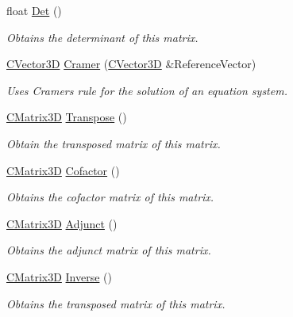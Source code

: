 \begin{DoxyCompactItemize}
\item 
float \hyperlink{struct_c_matrix3_d_ada0f0cc1d05bab82dcdda89af4d62616}{Det} ()
\begin{DoxyCompactList}\small\item\em Obtains the determinant of this matrix. \end{DoxyCompactList}\item 
\hyperlink{struct_c_vector3_d}{C\+Vector3D} \hyperlink{struct_c_matrix3_d_a9911c4211c2c0bf5b5b471f903d8bdec}{Cramer} (\hyperlink{struct_c_vector3_d}{C\+Vector3D} \&Reference\+Vector)
\begin{DoxyCompactList}\small\item\em Uses Cramer\textquotesingle{}s rule for the solution of an equation system. \end{DoxyCompactList}\item 
\hyperlink{struct_c_matrix3_d}{C\+Matrix3D} \hyperlink{struct_c_matrix3_d_ae34a579fdd8f790cc32e4b706a6c3aa0}{Transpose} ()
\begin{DoxyCompactList}\small\item\em Obtain the transposed matrix of this matrix. \end{DoxyCompactList}\item 
\hyperlink{struct_c_matrix3_d}{C\+Matrix3D} \hyperlink{struct_c_matrix3_d_a42606870cac788a68bde0f702ac18bb4}{Cofactor} ()
\begin{DoxyCompactList}\small\item\em Obtains the cofactor matrix of this matrix. \end{DoxyCompactList}\item 
\hyperlink{struct_c_matrix3_d}{C\+Matrix3D} \hyperlink{struct_c_matrix3_d_a048194634711d7344fb1a9d7b6996e08}{Adjunct} ()
\begin{DoxyCompactList}\small\item\em Obtains the adjunct matrix of this matrix. \end{DoxyCompactList}\item 
\hyperlink{struct_c_matrix3_d}{C\+Matrix3D} \hyperlink{struct_c_matrix3_d_a4ffab5f3f688032789317bebc7cace23}{Inverse} ()
\begin{DoxyCompactList}\small\item\em Obtains the transposed matrix of this matrix. \end{DoxyCompactList}\end{DoxyCompactItemize}
